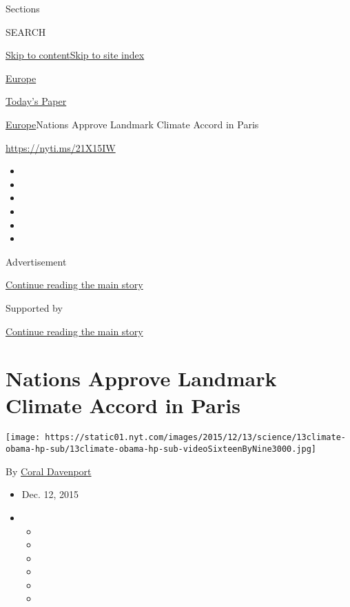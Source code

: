 Sections

SEARCH

\protect\hyperlink{site-content}{Skip to
content}\protect\hyperlink{site-index}{Skip to site index}

\href{https://www.nytimes.com/section/world/europe}{Europe}

\href{https://myaccount.nytimes.com/auth/login?response_type=cookie\&client_id=vi}{}

\href{https://www.nytimes.com/section/todayspaper}{Today's Paper}

\href{/section/world/europe}{Europe}\textbar{}Nations Approve Landmark
Climate Accord in Paris

\url{https://nyti.ms/21X15IW}

\begin{itemize}
\item
\item
\item
\item
\item
\item
\end{itemize}

Advertisement

\protect\hyperlink{after-top}{Continue reading the main story}

Supported by

\protect\hyperlink{after-sponsor}{Continue reading the main story}

\hypertarget{nations-approve-landmark-climate-accord-in-paris}{%
\section{Nations Approve Landmark Climate Accord in
Paris}\label{nations-approve-landmark-climate-accord-in-paris}}

\texttt{[image: https://static01.nyt.com/images/2015/12/13/science/13climate-obama-hp-sub/13climate-obama-hp-sub-videoSixteenByNine3000.jpg]}

By \href{https://www.nytimes.com/by/coral-davenport}{Coral Davenport}

\begin{itemize}
\item
  Dec. 12, 2015
\item
  \begin{itemize}
  \item
  \item
  \item
  \item
  \item
  \item
  \end{itemize}
\end{itemize}

